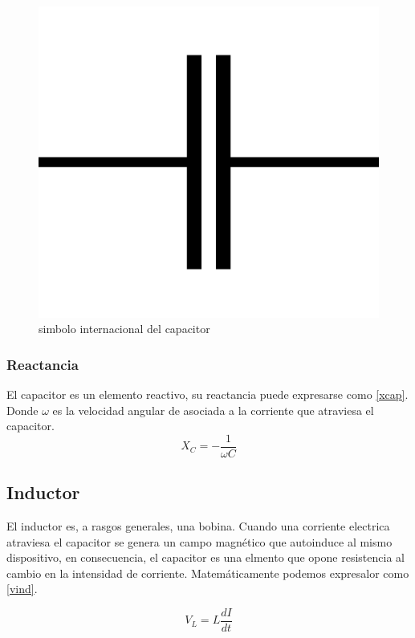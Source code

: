 \documentclass[letterpaper,12pt]{article} %
\begin{document}
\begin{figure}[h]
\includegraphics[scale=0.04]{capsym.png}
\centering
\caption{simbolo internacional del capacitor}
\label{fig:capsym}
\end{figure}

\subsubsection*{Reactancia}
El capacitor es un elemento reactivo, su reactancia puede expresarse como \eqref{xcap}. Donde $\omega$ es la velocidad angular de asociada a la corriente que atraviesa el capacitor.
\begin{equation}
X_C=-\frac{1}{\omega C}
\label{xcap}
\end{equation}

\subsection*{Inductor}

El inductor es, a rasgos generales, una bobina. Cuando una corriente electrica atraviesa el capacitor se genera un campo magnético que autoinduce al mismo dispositivo, en consecuencia, el capacitor es una elmento que opone resistencia al cambio en la intensidad de corriente. Matemáticamente podemos expresalor como \eqref{vind}.

\begin{equation}
V_L=L\frac{dI}{dt}
\label{vind}
\end{equation}
\end{document}
